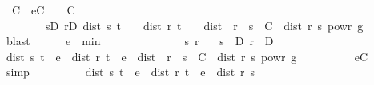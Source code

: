\begin{isabellebody}
\ {\isasymepsilon}\ C\ \ eC{\isacharcolon}{\kern0pt}\ {\isachardoublequoteopen}{\isasymepsilon}\ {\isachargreater}{\kern0pt}\ {}{\isachardoublequoteclose}\ {\isachardoublequoteopen}C\ {\isasymge}\ {}{\isachardoublequoteclose}\ \isanewline
\ \ \ \ \ \ \ \ {\isachardoublequoteopen}{\isacharparenleft}{\kern0pt}{\isasymforall}s{\isasymin}D{\isachardot}{\kern0pt}\ {\isasymforall}r{\isasymin}D{\isachardot}{\kern0pt}\ dist\ s\ t\ {\isasymle}\ {\isasymepsilon}\ {\isasymand}\ dist\ r\ t\ {\isasymle}\ {\isasymepsilon}\ {\isasymlongrightarrow}\ dist\ {\isacharparenleft}{\kern0pt}{\isasymphi}\ r{\isacharparenright}{\kern0pt}\ {\isacharparenleft}{\kern0pt}{\isasymphi}\ s{\isacharparenright}{\kern0pt}\ {\isasymle}\ C\ {\isacharasterisk}{\kern0pt}\ dist\ r\ s\ powr\ g{\isacharparenright}{\kern0pt}{\isachardoublequoteclose}\isanewline
\ \ \ \ \ \ \isamarkupfalse%
\ blast\isanewline
\ \ \ \ \isamarkupfalse%
\ {\isacharquery}{\kern0pt}e\ {\isacharequal}{\kern0pt}\ {\isachardoublequoteopen}min\ {\isasymepsilon}\ {\isacharparenleft}{\kern0pt}{}{\isacharslash}{\kern0pt}{}{\isacharparenright}{\kern0pt}{\isachardoublequoteclose}\isanewline
\ \ \ \ \isacommand{{\isacharbraceleft}{\kern0pt}}\isamarkupfalse%
\isanewline
\ \ \ \ \ \ \isamarkupfalse%
\ s\ r\ \isamarkupfalse%
\ {\isacharasterisk}{\kern0pt}{\isacharcolon}{\kern0pt}\ {\isachardoublequoteopen}s\ {\isasymin}\ D{\isachardoublequoteclose}\ {\isachardoublequoteopen}r\ {\isasymin}\ D{\isachardoublequoteclose}\isanewline
\ \ \ \ \ \ \isamarkupfalse%
\ \isamarkupfalse%
\ {\isachardoublequoteopen}dist\ s\ t\ {\isasymle}\ {\isacharquery}{\kern0pt}e\ {\isasymand}\ dist\ r\ t\ {\isasymle}\ {\isacharquery}{\kern0pt}e\ {\isasymlongrightarrow}\ dist\ {\isacharparenleft}{\kern0pt}{\isasymphi}\ r{\isacharparenright}{\kern0pt}\ {\isacharparenleft}{\kern0pt}{\isasymphi}\ s{\isacharparenright}{\kern0pt}\ {\isasymle}\ C\ {\isacharasterisk}{\kern0pt}\ dist\ r\ s\ powr\ g{\isachardoublequoteclose}\isanewline
\ \ \ \ \ \ \ \ \isamarkupfalse%
\ eC\ \isamarkupfalse%
\ simp\isanewline
\ \ \ \ \ \ \isamarkupfalse%
\ \isamarkupfalse%
\ {\isachardoublequoteopen}dist\ s\ t\ {\isasymle}\ {\isacharquery}{\kern0pt}e\ {\isasymand}\ dist\ r\ t\ {\isasymle}\ {\isacharquery}{\kern0pt}e\ {\isasymlongrightarrow}\ dist\ r\ s\ {\isasymle}\ {}{\isachardoublequoteclose}\isanewline
\ \ \ \ \ \ \ \ \isamarkupfalse%

\end{isabellebody}
